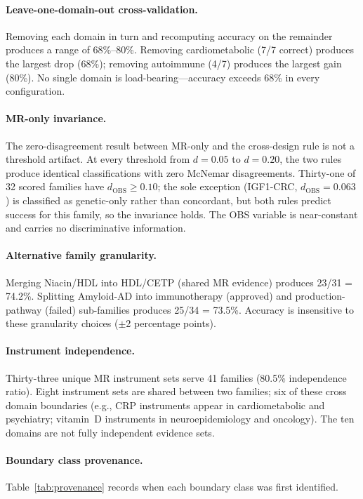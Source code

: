 \documentclass[11pt]{article}
\begin{document}
\paragraph{Leave-one-domain-out cross-validation.} Removing each domain in turn and recomputing accuracy on the remainder produces a range of 68\%--80\%. Removing cardiometabolic (7/7 correct) produces the largest drop (68\%); removing autoimmune (4/7) produces the largest gain (80\%). No single domain is load-bearing---accuracy exceeds 68\% in every configuration.

\paragraph{MR-only invariance.} The zero-disagreement result between MR-only and the cross-design rule is not a threshold artifact. At every threshold from $d = 0.05$ to $d = 0.20$, the two rules produce identical classifications with zero McNemar disagreements. Thirty-one of 32 scored families have $d_{\text{OBS}} \geq 0.10$; the sole exception (IGF1-CRC, $d_{\text{OBS}} = 0.063$) is classified as genetic-only rather than concordant, but both rules predict success for this family, so the invariance holds. The OBS variable is near-constant and carries no discriminative information.

\paragraph{Alternative family granularity.} Merging Niacin/HDL into HDL/CETP (shared MR evidence) produces 23/31 = 74.2\%. Splitting Amyloid-AD into immunotherapy (approved) and production-pathway (failed) sub-families produces 25/34 = 73.5\%. Accuracy is insensitive to these granularity choices ($\pm$2 percentage points).

\paragraph{Instrument independence.} Thirty-three unique MR instrument sets serve 41 families (80.5\% independence ratio). Eight instrument sets are shared between two families; six of these cross domain boundaries (e.g., CRP instruments appear in cardiometabolic and psychiatry; vitamin~D instruments in neuroepidemiology and oncology). The ten domains are not fully independent evidence sets.

\paragraph{Boundary class provenance.}
Table~\ref{tab:provenance} records when each boundary class was first identified.
\end{document}
